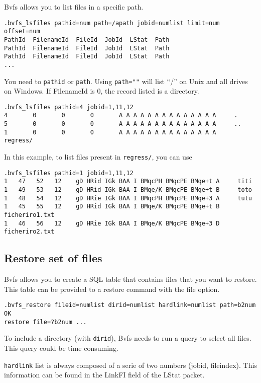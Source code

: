 Bvfs allows you to list files in a specific path.
\begin{verbatim}
.bvfs_lsfiles pathid=num path=/apath jobid=numlist limit=num offset=num
PathId  FilenameId  FileId  JobId  LStat  Path
PathId  FilenameId  FileId  JobId  LStat  Path
PathId  FilenameId  FileId  JobId  LStat  Path
...
\end{verbatim}

You need to \texttt{pathid} or \texttt{path}. Using \texttt{path=""} will list
``/'' on Unix and all drives on Windows. If FilenameId is 0, the record listed
is a directory.

\begin{verbatim}
.bvfs_lsfiles pathid=4 jobid=1,11,12
4       0       0       0       A A A A A A A A A A A A A A     .
5       0       0       0       A A A A A A A A A A A A A A     ..
1       0       0       0       A A A A A A A A A A A A A A     regress/
\end{verbatim}

In this example, to list files present in \texttt{regress/}, you can use
\begin{verbatim}
.bvfs_lsfiles pathid=1 jobid=1,11,12
1   47   52   12    gD HRid IGk BAA I BMqcPH BMqcPE BMqe+t A     titi
1   49   53   12    gD HRid IGk BAA I BMqe/K BMqcPE BMqe+t B     toto
1   48   54   12    gD HRie IGk BAA I BMqcPH BMqcPE BMqe+3 A     tutu
1   45   55   12    gD HRid IGk BAA I BMqe/K BMqcPE BMqe+t B     ficheriro1.txt
1   46   56   12    gD HRie IGk BAA I BMqe/K BMqcPE BMqe+3 D     ficheriro2.txt
\end{verbatim}

\subsection*{Restore set of files}

Bvfs allows you to create a SQL table that contains files that you want to
restore. This table can be provided to a restore command with the file option.

\begin{verbatim}
.bvfs_restore fileid=numlist dirid=numlist hardlink=numlist path=b2num
OK
restore file=?b2num ...
\end{verbatim}

To include a directory (with \texttt{dirid}), Bvfs needs to run a query to
select all files. This query could be time consuming.

\texttt{hardlink} list is always composed of a serie of two numbers (jobid,
fileindex). This information can be found in the LinkFI field of the LStat
packet.

